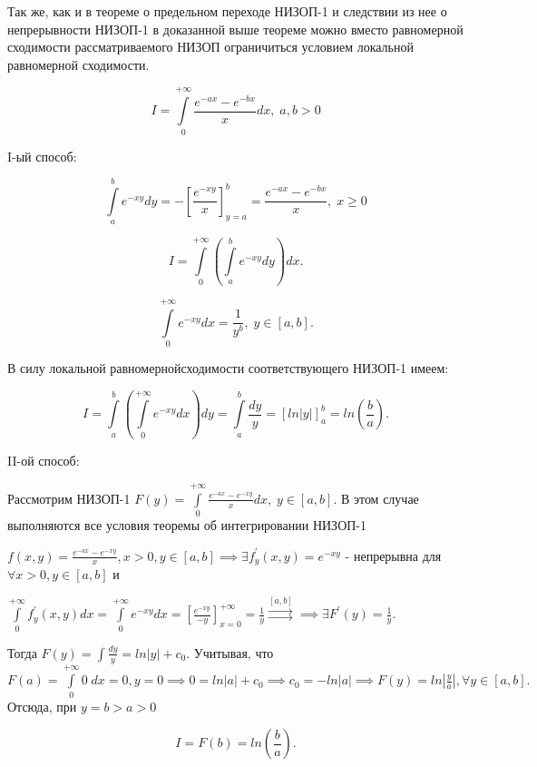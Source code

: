\documentclass[../../main.tex]{subfiles}
\begin{document}
\begin{rem}
	Так же, как и в теореме о предельном переходе НИЗОП-1 и следствии из нее о непрерывности НИЗОП-1 в доказанной выше теореме можно вместо равномерной сходимости рассматриваемого НИЗОП ограничиться условием локальной равномерной сходимости.
\end{rem}

\begin{exmp}
	$$
	I = \int\limits_0^{+\infty} \frac{e^{-ax} - e^{-bx}}{x} dx,\; a, b > 0
	$$
	
	I-ый способ:
	
	$$
	\int\limits_a^b e^{-xy} dy = -\left[ \frac{e^{-xy}}{x} \right]^{b}_{y = a} = \frac{e^{-ax} - e^{-bx}}{x}, \; x \geq 0
	$$
	
	$$
	I = \int\limits_0^{+\infty} \left( \int\limits_a^b e^{-xy} dy \right) dx.
	$$
	
	$$
	\int\limits_0^{+\infty} e^{-xy} dx = \frac{1}{y^b}, \; y \in [a, b].
	$$
	
	 В силу локальной равномернойсходимости соответствующего НИЗОП-1 имеем:
	 
	 $$
	 I = \int\limits_a^b \left( \int\limits_0^{+\infty} e^{-xy} dx \right) dy = \int\limits_a^b \frac{dy}{y} = \left[ ln|y| \right]^b_a = ln\left(\frac{b}{a}\right).
	 $$
	 
	 II-ой способ:
	 
	 Рассмотрим НИЗОП-1 $\displaystyle F(y) = \int\limits_0^{+\infty} \frac{e^{-ax} - e^{-xy}}{x} dx, \; y \in [a, b].$ В этом случае выполняются все условия теоремы об интегрировании НИЗОП-1
	 
	 $\displaystyle f(x, y) = \frac{e^{-ax} - e^{-xy}}{x}, x > 0, y \in [a, b] \implies \exists f^{'}_y (x, y) = e^{-xy}$
	  - непрерывна для 
	 $\forall x > 0, y \in [a, b]$ и 
	 
	 $\displaystyle \int\limits_0^{+\infty} f^{'}_y (x, y) dx = \int\limits^{+\infty}_0 e^{-xy} dx = \left[ \frac{e^{-xy}}{-y} \right]^{+\infty}_{x = 0} = \frac{1}{y} \overset{[a, b]}\rightrightarrows \implies \exists F^{'} (y) = \frac{1}{y}.$
	 
	 Тогда $\displaystyle F(y) = \int \frac{dy}{y} = ln|y| + c_0$. Учитывая, что $\displaystyle F(a) = \int\limits_0^{+\infty} 0\;dx = 0, y = 0 \implies 0 = ln|a| + c_0 \implies c_0 = -ln|a| \implies F(y) = ln\left| \frac{y}{a} \right|, \forall y \in [a, b].$ Отсюда, при $y = b > a > 0$
	 
	 $$
	 I = F(b) = ln\left(\frac{b}{a}\right).
	 $$
\end{exmp}
\end{document}
